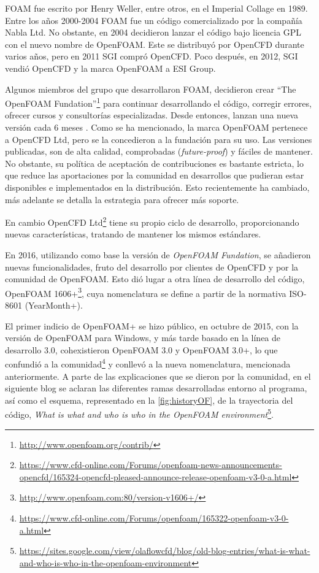 FOAM fue escrito por Henry Weller, entre otros, en el Imperial Collage
en 1989. Entre los años 2000-2004 FOAM fue un código comercializado por
la compañía Nabla Ltd. No obstante, en 2004 decidieron lanzar el código
bajo licencia GPL con el nuevo nombre de OpenFOAM. Este se distribuyó
por OpenCFD durante varios años, pero en 2011 SGI compró OpenCFD. Poco
después, en 2012, SGI vendió OpenCFD y la marca OpenFOAM a ESI Group.

Algunos miembros del grupo que desarrollaron FOAM, decidieron crear
``The OpenFOAM Fundation''\footnote{\url{http://www.openfoam.org/contrib/}} para
continuar desarrollando el código, corregir errores, ofrecer cursos y
consultorías especializadas. Desde entonces, lanzan una nueva versión
cada 6 meses \cite{release}. Como se ha mencionado, la marca OpenFOAM pertenece a OpenCFD
Ltd, pero se la concedieron a la fundación para su uso. Las versiones
publicadas, son de alta calidad, comprobadas (\emph{future-proof}) y
fáciles de mantener. No obstante, su política de aceptación de
contribuciones es bastante estricta, lo que reduce las aportaciones por
la comunidad en desarrollos que pudieran estar disponibles e
implementados en la distribución. Esto recientemente ha cambiado, más
adelante se detalla la estrategia para ofrecer más soporte.

En cambio OpenCFD Ltd\footnote{\url{https://www.cfd-online.com/Forums/openfoam-news-announcements-opencfd/165324-opencfd-pleased-announce-release-openfoam-v3-0-a.html}} tiene su propio ciclo de desarrollo, proporcionando nuevas
características, tratando de mantener los mismos estándares.

En 2016, utilizando como base la versión de \emph{OpenFOAM Fundation},
se añadieron nuevas funcionalidades, fruto del desarrollo por clientes
de OpenCFD y por la comunidad de OpenFOAM. Esto dió lugar a otra línea
de desarrollo del código, OpenFOAM 1606+\footnote{\url{http://www.openfoam.com:80/version-v1606+/}}, cuya nomenclatura se define a partir de la normativa ISO-8601 (YearMonth+).

El primer indicio de OpenFOAM+ se hizo público, en octubre de 2015, con
la versión de OpenFOAM para Windows, y más tarde basado en la línea de
desarrollo 3.0, cohexistieron OpenFOAM 3.0 y OpenFOAM 3.0+, lo que
confundió a la comunidad\footnote{\url{https://www.cfd-online.com/Forums/openfoam/165322-openfoam-v3-0-a.html}} y conllevó a la nueva nomenclatura, mencionada anteriormente.
A parte de las explicaciones que se dieron por la comunidad, en el
siguiente blog se aclaran las diferentes ramas desarrolladas entorno al
programa, así como el esquema, representado en la \autoref{fig:historyOF}, de la trayectoria del código, \emph{What
is what and who is who in the OpenFOAM environment}\footnote{\url{https://sites.google.com/view/olaflowcfd/blog/old-blog-entries/what-is-what-and-who-is-who-in-the-openfoam-environment}}.

